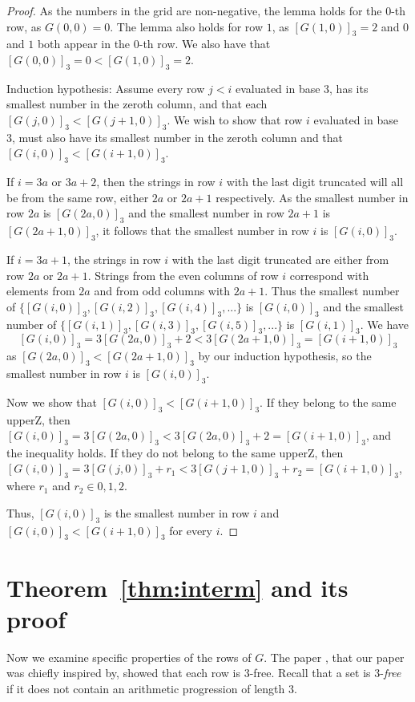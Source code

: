 \documentclass[12pt,reqno]{article}
\theoremstyle{plain}
\theoremstyle{definition}
\theoremstyle{remark}
\begin{document}
\begin{proof}
As the numbers in the grid are non-negative, the lemma holds for the $0$-th row, as $G(0,0) = 0$.
The lemma also holds for row $1$, as $[G(1,0)]_3 = 2$ and $0$ and $1$ both appear in the $0$-th row. We also have that $[G(0,0)]_3 = 0 < [G(1,0)]_3 = 2$.

Induction hypothesis: Assume every row  $j<i$ evaluated in base 3, has its smallest number in the zeroth column, and that each $[G(j,0)]_3<[G(j+1,0)]_3$. We wish to show that row $i$ evaluated in base 3, must also have its smallest number in the zeroth column and that $[G(i,0)]_3<[G(i+1,0)]_3$.

If $i = 3a$ or $3a+2$, then the strings in row $i$ with the last digit truncated will all be from the same row, either $2a$ or $2a+1$ respectively. As the smallest number in row $2a$ is $[G(2a,0)]_3$ and the smallest number in row $2a+1$ is $[G(2a+1,0)]_3$, it follows that the smallest number in row $i$ is $[G(i,0)]_3$.

If $i = 3a+1$, the strings in row $i$ with the last digit truncated are either from row $2a$ or $2a+1$. Strings from the even columns of row $i$ correspond with elements from $2a$ and from odd columns with $2a+1$. Thus the smallest number of $\{[G(i,0)]_3,[G(i,2)]_3,[G(i,4)]_3,...\}$ is $[G(i,0)]_3$ and the smallest number of $\{[G(i,1)]_3,[G(i,3)]_3,[G(i,5)]_3,...\}$ is $[G(i,1)]_3$. We have \[[G(i,0)]_3 = 3[G(2a,0)]_3+2 < 3[G(2a+1,0)]_3 = [G(i+1,0)]_3\] as $[G(2a,0)]_3 < [G(2a+1,0)]_3$ by our induction hypothesis, so the smallest number in row $i$ is $[G(i,0)]_3$.

Now we show that $[G(i,0)]_3<[G(i+1,0)]_3$. If they belong to the same upperZ, then $[G(i,0)]_3 = 3[G(2a,0)]_3 < 3[G(2a,0)]_3+2 = [G(i+1,0)]_3$, and the inequality holds. If they do not belong to the same upperZ, then $[G(i,0)]_3 = 3[G(j,0)]_3+r_1 < 3[G(j+1,0)]_3+r_2 = [G(i+1,0)]_3$, where $r_1$ and $r_2 \in {0,1,2}$.

Thus, $[G(i,0)]_3$ is the smallest number in row $i$ and $[G(i,0)]_3<[G(i+1,0)]_3$ for every $i$.
\end{proof}



\section{Theorem~\ref{thm:interm} and its proof}\label{sec:proof}

Now we examine specific properties of the rows of $G$. The paper \cite{PSS}, that our paper was chiefly inspired by, showed that each row is 3-free. Recall that a set is 3-\textit{free} if it does not contain an arithmetic progression of length 3. 
\end{document}
